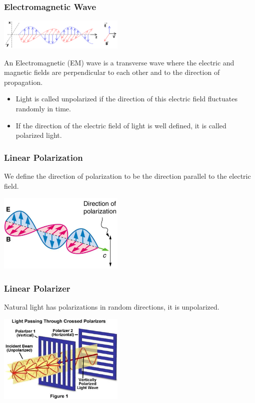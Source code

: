 \documentclass{beamer}
\begin{document}
\begin{frame}\frametitle{Electromagnetic Wave}

\begin{center}
\includegraphics[width=6cm]{fig/em_wave.png}
\end{center}

An Electromagnetic (EM) wave is a transverse wave where the electric and magnetic fields are perpendicular to each other and to the direction of propagation. 

\begin{itemize}
\item Light is called unpolarized if the direction of this electric field fluctuates randomly in time. 
\item If the direction of the electric field of light is well defined, it is called polarized light. 
\end{itemize}

\end{frame}



\begin{frame}\frametitle{Linear Polarization}

We define the direction of polarization to be the direction parallel to the electric field.

\begin{center}
\includegraphics[width=6cm]{fig/polarization1.png}
\end{center}

\end{frame}

\begin{frame}\frametitle{Linear Polarizer}

Natural light has polarizations in random directions, it is unpolarized.

\begin{center}
\includegraphics[width=6cm]{fig/polarizer.jpg}
\end{center}

\end{frame}
\end{document}
